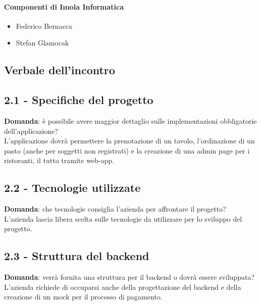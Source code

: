 \documentclass[italian,12pt]{article} %
\begin{document}
\paragraph{Componenti di Imola Informatica}

\begin{itemize}
	\item Federico Bernacca
	\item Stefan Glamocak
\end{itemize}

\newpage

\begin{flushleft}
\section{Verbale dell'incontro}

\subsection*{2.1 - Specifiche del progetto}
	\textbf{Domanda}: è possibile avere maggior dettaglio sulle implementazioni obbligatorie dell'applicazione?\\
	L'applicazione dovrà permettere la prenotazione di un tavolo, l'ordinazione di un pasto (anche per soggetti non registrati) e la creazione di una admin page per i ristoranti, il tutto tramite web-app.\\
\subsection*{2.2 - Tecnologie utilizzate}
	\textbf{Domanda}: che tecnologie consiglia l'azienda per affrontare il progetto?\\
	L'azienda lascia libera scelta sulle tecnologie da utilizzare per lo sviluppo del progetto.\\
\subsection*{2.3 - Struttura del backend}
	\textbf{Domanda}: verrà fornita una struttura per il backend o dovrà essere sviluppata?\\
	L'azienda richiede di occuparsi anche della progettazione del backend e della creazione di un mock per il processo di pagamento.\\


\end{flushleft}
\end{document}
